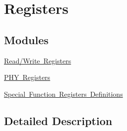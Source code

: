 \hypertarget{group__registers}{}\section{Registers}
\label{group__registers}
\subsection*{Modules}
\begin{DoxyCompactItemize}
\item 
\mbox{\hyperlink{group__readwrite}{Read/\+Write Registers}}
\item 
\mbox{\hyperlink{group__phy}{P\+H\+Y Registers}}
\item 
\mbox{\hyperlink{group___s_f_rs}{Special Function Registers Definitions}}
\end{DoxyCompactItemize}


\subsection{Detailed Description}
